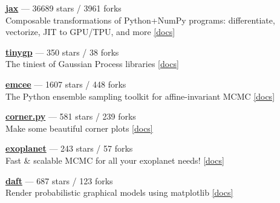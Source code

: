 \item \href{https://github.com/jax-ml/jax}{{\bf jax}} --- 36689 stars / 3961 forks \\
Composable transformations of Python+NumPy programs: differentiate, vectorize, JIT to GPU/TPU, and more \href{https://docs.jax.dev}{[docs]}

\item \href{https://github.com/dfm/tinygp}{{\bf tinygp}} --- 350 stars / 38 forks \\
The tiniest of Gaussian Process libraries \href{https://tinygp.readthedocs.io}{[docs]}

\item \href{https://github.com/dfm/emcee}{{\bf emcee}} --- 1607 stars / 448 forks \\
The Python ensemble sampling toolkit for affine-invariant MCMC \href{https://emcee.readthedocs.io}{[docs]}

\item \href{https://github.com/dfm/corner.py}{{\bf corner.py}} --- 581 stars / 239 forks \\
Make some beautiful corner plots \href{http://corner.readthedocs.io}{[docs]}

\item \href{https://github.com/exoplanet-dev/exoplanet}{{\bf exoplanet}} --- 243 stars / 57 forks \\
Fast {\&} scalable MCMC for all your exoplanet needs!  \href{https://docs.exoplanet.codes}{[docs]}

\item \href{https://github.com/daft-dev/daft}{{\bf daft}} --- 687 stars / 123 forks \\
Render probabilistic graphical models using matplotlib \href{https://docs.daft-pgm.org}{[docs]}